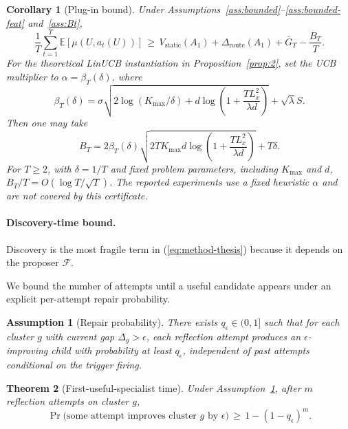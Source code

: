 \documentclass{article} %
\newtheorem{theorem}{Theorem}
\newtheorem{corollary}[theorem]{Corollary}
\newtheorem{assumption}{Assumption}
\providecommand{\E}{\mathbb{E}}
\renewcommand{\eqref}[1]{\textup{(\ref{#1})}}
\begin{document}
\begin{corollary}[Plug-in bound]
\label{cor:plugin}
Under Assumptions~\ref{ass:bounded}--\ref{ass:bounded-feat} and~\ref{ass:Bt},
\begin{equation}
\label{eq:cor-plugin}
\frac{1}{T}\sum_{t=1}^T \E[\mu(U, a_t(U))]
\,\ge\, V_{\mathrm{static}}(A_1) + \Delta_{\mathrm{route}}(A_1) + \bar G_T - \frac{B_T}{T}.
\end{equation}
For the theoretical LinUCB instantiation in Proposition~\ref{prop:2}, set the UCB multiplier to $\alpha=\beta_T(\delta)$, where
\begin{equation}
\label{eq:cor-plugin-beta}
\beta_T(\delta)
=
\sigma\sqrt{2\log(K_{\max}/\delta)
+d\log\!\left(1+\frac{TL_x^2}{\lambda d}\right)}
+\sqrt{\lambda}S.
\end{equation}
Then one may take
\begin{equation}
\label{eq:cor-plugin-rate}
B_T
=
2\beta_T(\delta)
\sqrt{2TK_{\max}d
\log\!\left(1+\frac{TL_x^2}{\lambda d}\right)}
+T\delta.
\end{equation}
For \(T\ge2\), with \(\delta=1/T\) and fixed problem parameters, including \(K_{\max}\) and
\(d\), \(B_T/T=O(\log T/\sqrt T)\). The reported experiments use a fixed
heuristic \(\alpha\) and are not covered by this certificate.
\end{corollary}

\paragraph{Discovery-time bound.}

\label{sec:method-specialist}

Discovery is the most fragile term in \eqref{eq:method-thesis} because it depends on the proposer $\mathcal{F}$.

We bound the number of attempts until a useful candidate appears under an explicit per-attempt repair probability.

\begin{assumption}[Repair probability]
\label{ass:repair}
There exists $q_\epsilon \in (0,1]$ such that for each cluster $g$ with current gap $\Delta_g > \epsilon$, each reflection attempt produces an $\epsilon$-improving child with probability at least $q_\epsilon$, independent of past attempts conditional on the trigger firing.
\end{assumption}

\begin{theorem}[First-useful-specialist time]
\label{thm:specialist}
Under Assumption~\ref{ass:repair}, after $m$ reflection attempts on cluster $g$,
\begin{equation}
\label{eq:thm-specialist}
\Pr\bigl(\text{some attempt improves cluster } g \text{ by } \epsilon\bigr) \,\ge\, 1 - (1 - q_\epsilon)^m.
\end{equation}
\end{theorem}
\end{document}
